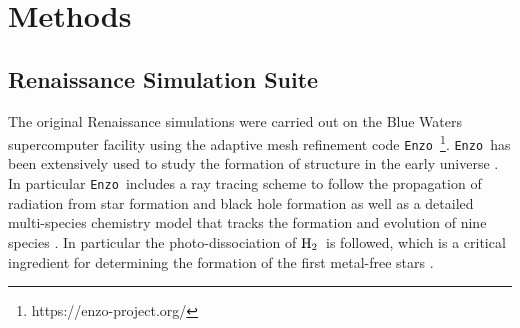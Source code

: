 \documentclass[graphics, twocolumn, usenatbib]{mn2e}
\newcommand{\enzo}{\texttt{Enzo~}}
\newcommand{\molH} {$\rm{H_2}$~}
\begin{document}
\section{Methods} \label{Sec:Methods}


\subsection{Renaissance Simulation Suite} \label{Sec:Renaissance}
The original Renaissance simulations were carried out on the Blue Waters supercomputer facility
using the adaptive mesh refinement code \enzo\citep{Enzo_2014, Enzo_2019}\footnote{https://enzo-project.org/}.
\enzo has been extensively used to study the formation of structure in the early universe
\citep{Abel_2002, OShea_2005b, Turk_2012, Wise_2012b, Wise_2014, Regan_2015, Regan_2017}.
In particular \enzo includes a ray tracing scheme to follow the propagation of radiation from
star formation and black hole formation \citep{WiseAbel_2011} as well as a detailed multi-species
chemistry model that tracks the formation and evolution of nine species \citep{Anninos_1997,
  Abel_1997}. In particular the photo-dissociation of \molH is followed, which is a critical
ingredient for determining the formation of the first metal-free stars \citep{Abel_2000}. 
\end{document}
